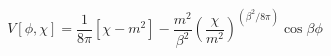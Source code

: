 \begin{equation}
V[\phi,\chi] = \frac{1}{8 \pi} [\chi-m^2] - \frac{m^2}{\beta^2} (\frac
{\chi}{m^2})^{(\beta^2/ 8 \pi)}
\cos \beta \phi
\end{equation}

